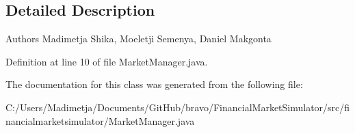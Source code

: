 \subsection{Detailed Description}
\begin{DoxyAuthor}{Authors}
Madimetja Shika, Moeletji Semenya, Daniel Makgonta 
\end{DoxyAuthor}


Definition at line 10 of file Market\+Manager.\+java.



The documentation for this class was generated from the following file\+:\begin{DoxyCompactItemize}
\item 
C\+:/\+Users/\+Madimetja/\+Documents/\+Git\+Hub/bravo/\+Financial\+Market\+Simulator/src/financialmarketsimulator/Market\+Manager.\+java\end{DoxyCompactItemize}
